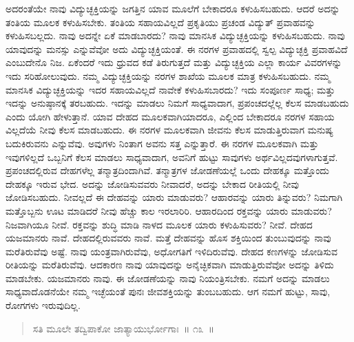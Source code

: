 ಅದರಂತೆಯೇ ನಾವು ವಿದ್ಯುಚ್ಛಕ್ತಿಯನ್ನು ಜಗತ್ತಿನ ಯಾವ ಮೂಲೆಗೆ ಬೇಕಾದರೂ ಕಳುಹಿಸಬಹುದು. ಆದರೆ ಅದನ್ನು ತಂತಿಯ ಮೂಲಕ ಕಳುಹಿಸಬೇಕು. ತಂತಿಯ ಸಹಾಯವಿಲ್ಲದೆ ಪ್ರಕೃತಿಯು ಪ್ರಚಂಡ ವಿದ್ಯುತ್​ ಪ್ರವಾಹವನ್ನು ಕಳುಹಿಸಬಲ್ಲದು. ನಾವು ಅದನ್ನೇ ಏಕೆ ಮಾಡಬಾರದು? ನಾವು ಮಾನಸಿಕ ವಿದ್ಯುಚ್ಛಕ್ತಿಯನ್ನು ಕಳುಹಿಸಬಹುದು. ನಾವು ಯಾವುದನ್ನು ಮನಸ್ಸು ಎನ್ನುವೆವೋ ಅದು ವಿದ್ಯುಚ್ಛಕ್ತಿಯಂತೆ. ಈ ನರಗಳ ಪ್ರವಾಹದಲ್ಲಿ ಸ್ವಲ್ಪ ವಿದ್ಯುಚ್ಛಕ್ತಿ ಪ್ರವಾಹವಿದೆ ಎಂಬುದೇನೊ ನಿಜ. ಏಕೆಂದರೆ ಇದು ಧ್ರುವದ ಕಡೆ ತಿರುಗುತ್ತದೆ ಮತ್ತು ವಿದ್ಯುಚ್ಛಕ್ತಿಯ ಎಲ್ಲಾ ಕಾರ್ಯ ವಿವರಗಳನ್ನು ಇದು ಸರಿಹೋಲುವುದು. ನಮ್ಮ ವಿದ್ಯುಚ್ಛಕ್ತಿಯನ್ನು ನರಗಳ ಶಾಖೆಯ ಮೂಲಕ ಮಾತ್ರ ಕಳುಹಿಸಬಹುದು. ನಮ್ಮ ಮಾನಸಿಕ ವಿದ್ಯುಚ್ಛಕ್ತಿಯನ್ನು ಇದರ ಸಹಾಯವಿಲ್ಲದೆ ನಾವೇಕೆ ಕಳುಹಿಸಬಾರದು? ಇದು ಸಂಪೂರ್ಣ ಸಾಧ್ಯ; ಮತ್ತು ಇದನ್ನು ಅನುಷ್ಠಾನಕ್ಕೆ ತರಬಹುದು. ಇದನ್ನು ಮಾಡಲು ನಿಮಗೆ ಸಾಧ್ಯವಾದಾಗ, ಪ್ರಪಂಚದಲ್ಲೆಲ್ಲ ಕೆಲಸ ಮಾಡಬಹುದು ಎಂದು ಯೋಗಿ ಹೇಳುತ್ತಾನೆ. ಯಾವ ದೇಹದ ಮೂಲಕವಾಗಿಯಾದರೂ, ಎಲ್ಲಿಂದ ಬೇಕಾದರೂ ನರಗಳ ಸಹಾಯ ವಿಲ್ಲದೆಯೆ ನೀವು ಕೆಲಸ ಮಾಡಬಹುದು. ಈ ನರಗಳ ಮೂಲಕವಾಗಿ ಜೀವನು ಕೆಲಸ ಮಾಡುತ್ತಿರುವಾಗ ಮನುಷ್ಯ ಬದುಕಿರುವನು ಎನ್ನುವೆವು. ಅವುಗಳು ನಿಂತಾಗ ಅವನು ಸತ್ತ ಎನ್ನುತ್ತಾರೆ. ಈ ನರಗಳ ಮೂಲಕವಾಗಿ ಮತ್ತು ಇವುಗಳಿಲ್ಲದೆ ಒಬ್ಬನಿಗೆ ಕೆಲಸ ಮಾಡಲು ಸಾಧ್ಯವಾದಾಗ, ಅವನಿಗೆ ಹುಟ್ಟು ಸಾವುಗಳು ಅರ್ಥವಿಲ್ಲದವುಗಳಾಗುತ್ತವೆ. ಪ್ರಪಂಚದಲ್ಲಿರುವ ದೇಹಗಳೆಲ್ಲ ತನ್ಮಾತ್ರದಿಂದಾಗಿವೆ. ತನ್ಮಾತ್ರಗಳ ಜೋಡಣೆಯಲ್ಲೆ ಒಂದು ದೇಹಕ್ಕೂ ಮತ್ತೊಂದು ದೇಹಕ್ಕೂ ಇರುವ ಭೇದ. ಅದನ್ನು ಜೋಡಿಸುವವರು ನೀವಾದರೆ, ಅದನ್ನು ಬೇಕಾದ ರೀತಿಯಲ್ಲಿ ನೀವು ಜೋಡಿಸಬಹುದು. ನೀವಲ್ಲದೆ ಈ ದೇಹವನ್ನು ಯಾರು ಮಾಡುವರು? ಆಹಾರವನ್ನು ಯಾರು ತಿನ್ನುವರು? ನಿಮಗಾಗಿ ಮತ್ತೊಬ್ಬನು ಊಟ ಮಾಡಿದರೆ ನೀವು ಹೆಚ್ಚು ಕಾಲ ಇರಲಾರಿರಿ. ಆಹಾರದಿಂದ ರಕ್ತವನ್ನು ಯಾರು ಮಾಡುವರು? ನಿಜವಾಗಿಯೂ ನೀವೆ. ರಕ್ತವನ್ನು ಶುದ್ಧಿ ಮಾಡಿ ನಾಳದ ಮೂಲಕ ಯಾರು ಕಳುಹಿಸುವರು? ನೀವೆ. ದೇಹದ ಯಜಮಾನರು ನಾವೆ. ದೇಹದಲ್ಲಿರುವವರು ನಾವೆ. ಮತ್ತೆ ದೇಹವನ್ನು ಹೊಸ ಶಕ್ತಿಯಿಂದ ತುಂಬುವುದನ್ನು ನಾವು ಮರೆತಿರುವೆವು ಅಷ್ಟೆ. ನಾವು ಯಂತ್ರವಾಗಿರುವೆವು, ಅಧೋಗತಿಗೆ ಇಳಿದಿರುವೆವು. ದೇಹದ ಕಣಗಳನ್ನು ಜೋಡಿಸುವ ರೀತಿಯನ್ನು ಮರೆತಿರುವೆವು. ಆದಕಾರಣ ನಾವು ಯಾವುದನ್ನು ಅನೈಚ್ಛಿಕವಾಗಿ ಮಾಡುತ್ತಿರುವೆವೋ ಅದನ್ನು ತಿಳಿದು ಮಾಡಬೇಕು. ಯಜಮಾನರು ನಾವು. ಈ ಜೋಡಣೆಯನ್ನು ನಾವು ನಿಯಂತ್ರಿಸಬೇಕು. ನಮಗೆ ಅದನ್ನು ಮಾಡಲು ಸಾಧ್ಯವಾದೊಡನೆಯೇ ನಮ್ಮ ಇಚ್ಛೆಯಂತೆ ಪುನಃ ಜೀವಶಕ್ತಿಯನ್ನು ತುಂಬಬಹುದು. ಆಗ ನಮಗೆ ಹುಟ್ಟು, ಸಾವು, ರೋಗಗಳು ಇರುವುದಿಲ್ಲ. 


\begin{verse}
ಸತಿ ಮೂಲೇ ತದ್ವಿಪಾಕೋ ಜಾತ್ಯಾಯುರ್ಭೋಗಾಃ~॥ ೧೩~॥
\end{verse}

\vspace{-0.3cm}


\vskip 0.2cm 

